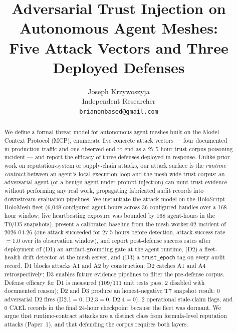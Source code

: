 \documentclass[letterpaper,twocolumn,10pt]{article}
\newcommand{\holoscript}{HoloScript}
\newcommand{\holomesh}{HoloMesh}
\newcommand{\trustepoch}{\texttt{trust\_epoch}}
\begin{document}
\title{\Large \bf Adversarial Trust Injection on Autonomous Agent Meshes:\\
Five Attack Vectors and Three Deployed Defenses}

\author{
{\rm Joseph Krzywoszyja}\\
Independent Researcher\\
\texttt{brianonbased@gmail.com}
}

\maketitle

\begin{abstract}
We define a formal threat model for autonomous agent meshes built on the
Model Context Protocol (MCP), enumerate five concrete attack vectors --- four
documented in production traffic and one observed end-to-end as a 27.5-hour
trust-corpus poisoning incident --- and report the efficacy of three defenses
deployed in response. Unlike prior work on reputation-system or supply-chain
attacks, our attack surface is the \emph{runtime contract} between an
agent's local execution loop and the mesh-wide trust corpus: an adversarial
agent (or a benign agent under prompt injection) can mint trust evidence
without performing any real work, propagating fabricated audit records into
downstream evaluation pipelines. We instantiate the attack model on the
\holoscript{} \holomesh{} fleet (6{,}048 configured agent-hours across
36 configured handles over a 168-hour window; live heartbeating exposure
was bounded by 168 agent-hours in the T0/D5 snapshots), present a
calibrated baseline from the
mesh-worker-02 incident of 2026-04-26 (one attack succeeded for 27.5 hours
before detection, attack-success rate $= 1.0$ over its observation window),
and report post-defense success rates after deployment of (D1) an
artifact-grounding gate at the agent runtime, (D2) a fleet-health drift
detector at the mesh server, and (D3) a \trustepoch{} tag on every audit
record. D1 blocks attacks A1 and A2 by construction; D2 catches A1 and A4
retrospectively; D3 enables future evidence pipelines to filter the
pre-defense corpus. Defense efficacy for D1 is measured ($109/111$ unit
tests pass; 2 disabled with documented reason); D2 and D3 produce an
honest-negative T7 snapshot result: 0 adversarial D2 fires
(D2.1$=0$, D2.3$=0$, D2.4$=0$), 2 operational stale-claim flags, and
0 CAEL records in the final 24-hour checkpoint because the fleet was
dormant. We argue that runtime-contract attacks are a distinct
class from formula-level reputation attacks (Paper~1), and that defending
the corpus requires both layers.
\end{abstract}
\end{document}
